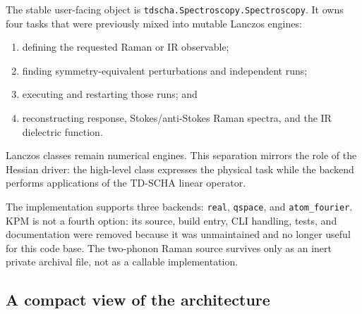 \documentclass[11pt,a4paper]{article}
\begin{document}
The stable user-facing object is
\texttt{tdscha.Spectroscopy.Spectroscopy}.  It owns four tasks that were
previously mixed into mutable Lanczos engines:
\begin{enumerate}
  \item defining the requested Raman or IR observable;
  \item finding symmetry-equivalent perturbations and independent runs;
  \item executing and restarting those runs; and
  \item reconstructing response, Stokes/anti-Stokes Raman spectra, and the IR
        dielectric function.
\end{enumerate}
Lanczos classes remain numerical engines.  This separation mirrors the role
of the Hessian driver: the high-level class expresses the physical task while
the backend performs applications of the TD-SCHA linear operator.

The implementation supports three backends:
\texttt{real}, \texttt{qspace}, and \texttt{atom\_fourier}.  KPM is not a
fourth option: its source, build entry, CLI handling, tests, and documentation
were removed because it was unmaintained and no longer useful for this code
base.  The two-phonon Raman source survives only as an inert private archival
file, not as a callable implementation.

\subsection{A compact view of the architecture}

\begin{center}
\end{center}
\end{document}
